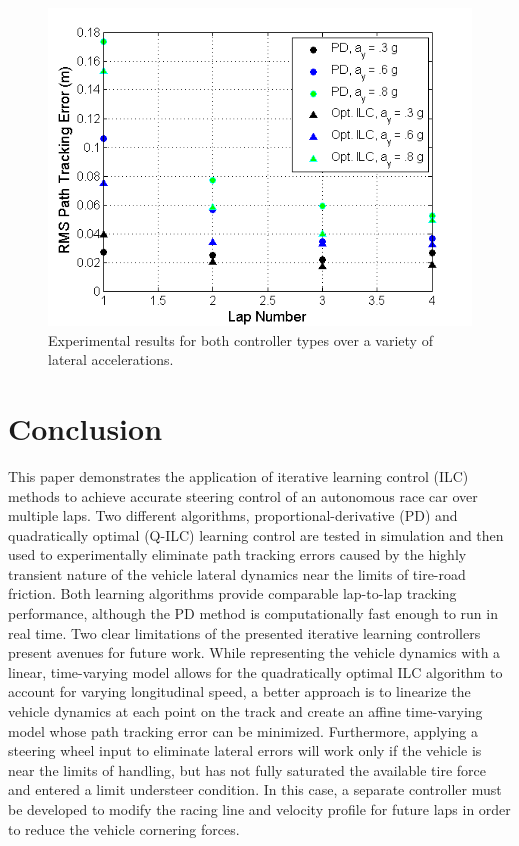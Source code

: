 \documentclass[letterpaper, 10 pt, conference]{ieeeconf}  %
\begin{document}
\begin{figure}
\centering
\includegraphics[width=3 in]{figures/allExp.png}
\caption{Experimental results for both controller types over a variety of lateral accelerations.}
\label{fig:allExp}
\end{figure}



                                  
\section{Conclusion}
This paper demonstrates the application of iterative learning control (ILC) methods to achieve accurate steering control
of an autonomous race car over multiple laps. Two different algorithms, proportional-derivative (PD) and 
quadratically optimal (Q-ILC) learning control are tested in simulation and then used to experimentally 
eliminate path tracking errors caused by the highly transient nature of the vehicle lateral dynamics near the limits of tire-road friction. 
Both learning algorithms provide comparable lap-to-lap tracking performance, although the PD method is computationally fast enough to run in real time. Two clear limitations of the presented iterative learning controllers present avenues for future work. While representing the vehicle dynamics
with a linear, time-varying model allows for the quadratically optimal ILC algorithm to account for varying longitudinal speed, a better approach is to linearize the vehicle
dynamics at each point on the track and create an affine time-varying model whose path tracking error can be minimized. Furthermore, applying a steering wheel input to eliminate
lateral errors will work only if the vehicle is near the limits of handling, but has not fully saturated the available tire force and entered a limit understeer condition.
In this case, a separate controller must be developed to modify the racing line and velocity profile for future laps in order to reduce the vehicle cornering forces.  
\end{document}
